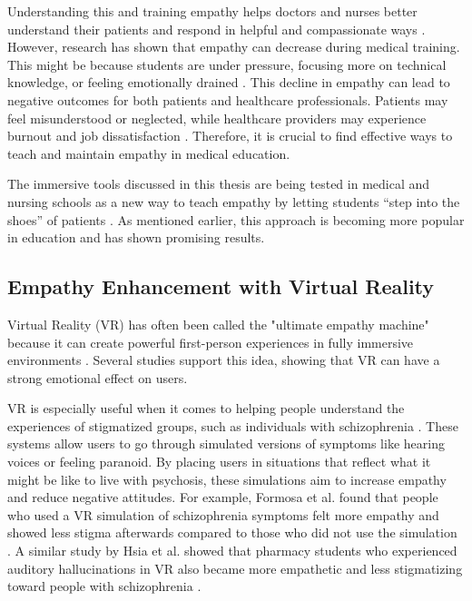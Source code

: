 Understanding this and training empathy helps doctors and nurses better understand their patients and respond in helpful and compassionate ways \cite{Ozcan2018, Olson1995}. However, research has shown that empathy can decrease during medical training. This might be because students are under pressure, focusing more on technical knowledge, or feeling emotionally drained \cite{Mattsson2024, Ozcan2018}. This decline in empathy can lead to negative outcomes for both patients and healthcare professionals. Patients may feel misunderstood or neglected, while healthcare providers may experience burnout and job dissatisfaction \cite{Mattsson2024, Cunico2012}. Therefore, it is crucial to find effective ways to teach and maintain empathy in medical education.

The immersive tools discussed in this thesis are being tested in medical and nursing schools as a new way to teach empathy by letting students “step into the shoes” of patients \cite{Alieldin2024}. As mentioned earlier, this approach is becoming more popular in education and has shown promising results.

\subsection{Empathy Enhancement with Virtual Reality}

Virtual Reality (VR) has often been called the "ultimate empathy machine" because it can create powerful first-person experiences in fully immersive environments \cite{Milk2015}. Several studies support this idea, showing that VR can have a strong emotional effect on users.

VR is especially useful when it comes to helping people understand the experiences of stigmatized groups, such as individuals with schizophrenia \cite{Formosa2018, Marques2022, Mattsson2024}. These systems allow users to go through simulated versions of symptoms like hearing voices or feeling paranoid. By placing users in situations that reflect what it might be like to live with psychosis, these simulations aim to increase empathy and reduce negative attitudes. For example, Formosa et al. found that people who used a VR simulation of schizophrenia symptoms felt more empathy and showed less stigma afterwards compared to those who did not use the simulation \cite{Formosa2018}. A similar study by Hsia et al. showed that pharmacy students who experienced auditory hallucinations in VR also became more empathetic and less stigmatizing toward people with schizophrenia \cite{Hsia2022}.

